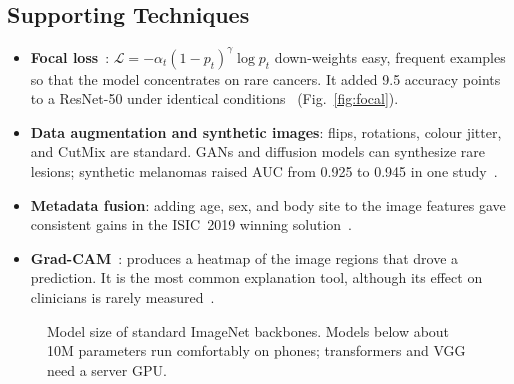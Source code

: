 \documentclass[10pt,a4paper]{article}
\begin{document}
\subsection{Supporting Techniques}
\begin{itemize}
  \item \textbf{Focal loss}~\cite{lin2017focal}:
        $\mathcal{L}=-\alpha_t(1-p_t)^{\gamma}\log p_t$ down-weights easy,
        frequent examples so that the model concentrates on rare
        cancers. It added 9.5 accuracy points to a ResNet-50 under
        identical conditions~\cite{nie2023hybrid} (Fig.~\ref{fig:focal}).
  \item \textbf{Data augmentation and synthetic images}: flips,
        rotations, colour jitter, and CutMix are standard. GANs and
        diffusion models can synthesize rare lesions; synthetic
        melanomas raised AUC from 0.925 to 0.945 in one
        study~\cite{lin2026}.
  \item \textbf{Metadata fusion}: adding age, sex, and body site to the
        image features gave consistent gains in the ISIC~2019 winning
        solution~\cite{gessert2020}.
  \item \textbf{Grad-CAM}~\cite{selvaraju2017gradcam}: produces a heatmap
        of the image regions that drove a prediction. It is the most
        common explanation tool, although its effect on clinicians is
        rarely measured~\cite{hauser2022}.
\end{itemize}

\begin{figure}[H]
\centering
{}
\caption{Model size of standard ImageNet backbones. Models below about
10M parameters run comfortably on phones; transformers and VGG need a
server GPU.}
\label{fig:params}
\end{figure}
\end{document}
